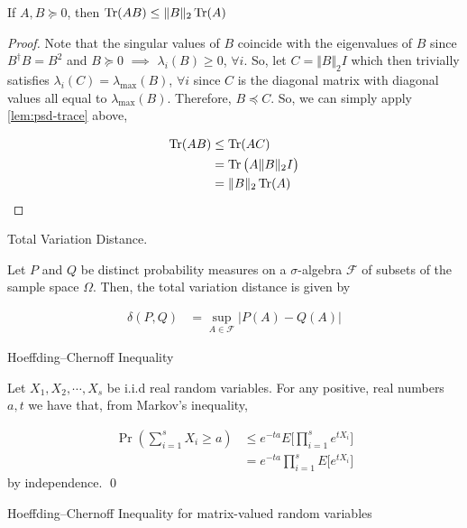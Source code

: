 \documentclass[main.tex]{subfiles}
\begin{document}
\begin{subappendices}
\begin{corollary}
\label{cor:psd-tr-norm-ineq}
If $A, B \succeq 0$, then $\Tr(AB) \leq \Vert B \Vert_2 \Tr(A)$

\begin{proof}
Note that the singular values of $B$ coincide with the eigenvalues of $B$ since $B^\dag B = B^2$ and $B \succeq 0$ $\implies$ $\lambda_i(B) \geq 0$, $\forall i$. So, let $C = \Vert B \Vert_2 I$ which then trivially satisfies $\lambda_i(C) = \lambda_{\max}(B)$, $\forall i$ since $C$ is the diagonal matrix with diagonal values all equal to $\lambda_{\max}(B)$. Therefore, $B \preceq C$. So, we can simply apply \ref{lem:psd-trace} above,

\begin{align*}
\Tr(AB) &\leq \Tr(AC) \\
&= \Tr\big(A \Vert B \Vert_2 I\big)\\
&= \Vert B \Vert_2 \Tr(A)
\end{align*}
\end{proof}
\end{corollary}

\begin{definition} Total Variation Distance.
\label{def:tve}

Let $P$ and $Q$ be distinct probability measures on a $\sigma$-algebra $\mathcal{F}$ of subsets of the sample space $\Omega$. Then, the total variation distance is given by

\begin{align*}
\delta(P, Q) &= \sup_{A \in \mathcal{F}}\vert P(A) - Q(A)\vert
\end{align*}
\end{definition}

\begin{lemma}Hoeffding--Chernoff Inequality
\label{lem:chernoff}

Let $X_1, X_2, \cdots, X_s$	be i.i.d real random variables. For any positive, real numbers $a, t$ we have that, from Markov's inequality,

\begin{align*}
\Pr(\sum_{i=1}^s X_i \geq a) &\leq e^{-ta} E\Bigg[\prod_{i=1}^s e^{tX_i}\Bigg]\\
&= e^{-ta} \prod_{i=1}^s E\Bigg[e^{tX_i}\Bigg]
\end{align*}
by independence.
\qed
\end{lemma}

\begin{theorem}Hoeffding--Chernoff Inequality for matrix-valued random variables \cite{kannan2017randomized}
	

\end{theorem}
\end{subappendices}
\end{document}
